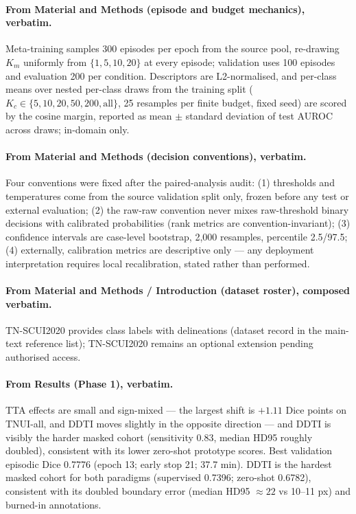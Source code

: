 \documentclass[11pt]{article}
\begin{document}
\paragraph{From Material and Methods (episode and budget mechanics), verbatim.}
Meta-training samples 300 episodes per epoch from the source pool,
re-drawing $K_m$ uniformly from $\{1,5,10,20\}$ at every episode;
validation uses 100 episodes and evaluation 200 per condition.
Descriptors are L2-normalised, and per-class means over nested per-class
draws from the training split ($K_c \in
\{5,10,20,50,\allowbreak 200,\mathrm{all}\}$, 25 resamples per finite
budget, fixed seed) are scored by the cosine margin, reported as mean
$\pm$ standard deviation of test AUROC across draws; in-domain only.

\paragraph{From Material and Methods (decision conventions), verbatim.}
Four conventions were fixed after the paired-analysis audit: (1)
thresholds and temperatures come from the source validation split only,
frozen before any test or external evaluation; (2) the raw-raw
convention never mixes raw-threshold binary decisions with calibrated
probabilities (rank metrics are convention-invariant); (3) confidence
intervals are case-level bootstrap, 2,000 resamples, percentile
2.5/97.5; (4) externally, calibration metrics are descriptive only ---
any deployment interpretation requires local recalibration, stated
rather than performed.

\paragraph{From Material and Methods / Introduction (dataset roster), composed verbatim.}
TN-SCUI2020 provides class labels with delineations (dataset record in
the main-text reference list); TN-SCUI2020 remains an optional extension
pending authorised access.

\paragraph{From Results (Phase 1), verbatim.}
TTA effects are small and sign-mixed --- the largest shift is $+1.11$
Dice points on TNUI-all, and DDTI moves slightly in the opposite
direction --- and DDTI is visibly the harder masked cohort (sensitivity
0.83, median HD95 roughly doubled), consistent with its lower zero-shot
prototype scores. Best validation episodic Dice 0.7776 (epoch 13; early
stop 21; 37.7 min).
DDTI is the hardest masked cohort for both paradigms (supervised 0.7396;
zero-shot 0.6782), consistent with its doubled boundary error (median
HD95 ${\approx}22$ vs 10--11 px) and burned-in annotations.
\end{document}
